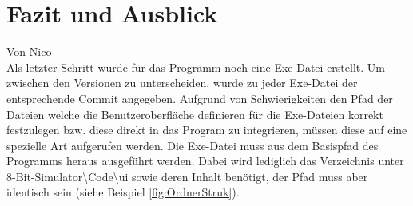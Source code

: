 \documentclass[12pt]{article}
\newcommand{\imgSpaceBefore}{\vspace{10pt}}
\begin{document}
\section{Fazit und Ausblick}
Von Nico \\
\noindent
Als letzter Schritt wurde für das Programm noch eine Exe Datei erstellt. Um zwischen den Versionen zu unterscheiden, wurde zu jeder Exe-Datei der entsprechende Commit angegeben. Aufgrund von Schwierigkeiten den Pfad der Dateien welche die Benutzeroberfläche definieren für die Exe-Dateien korrekt festzulegen bzw. diese direkt in das Program zu integrieren, müssen diese auf eine spezielle Art aufgerufen werden. Die Exe-Datei muss aus dem Basispfad des Programms heraus ausgeführt werden. Dabei wird lediglich das Verzeichnis unter 8-Bit-Simulator\textbackslash Code\textbackslash ui sowie deren Inhalt benötigt, der Pfad muss aber identisch sein (siehe Beispiel \ref{fig:OrdnerStruk}).\imgSpaceBefore
\end{document}
